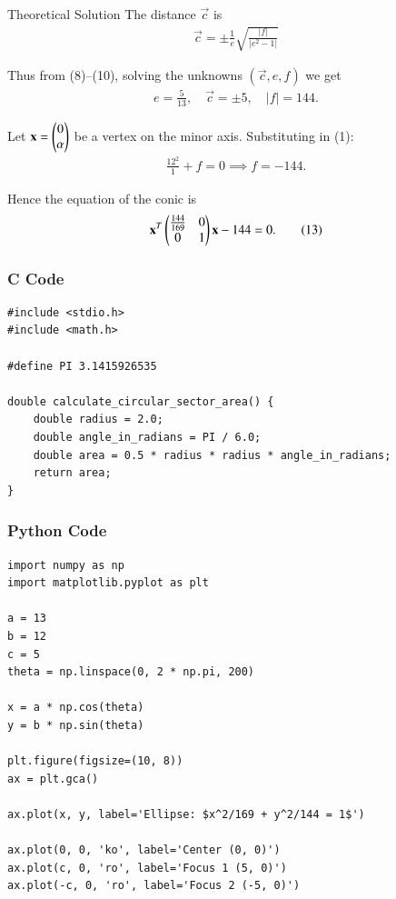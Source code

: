 \documentclass{beamer}
\begin{document}
\begin{frame}{Theoretical Solution}
The distance $\vec{c}$ is
\begin{align}
\vec{c} = \pm \frac{1}{e}\sqrt{\frac{|f|}{|e^2-1|}} \tag{10}
\end{align}

Thus from (8)--(10), solving the unknowns $(\vec{c},e,f)$ we get
\begin{align}
e = \tfrac{5}{13},\quad \vec{c} = \pm 5, \quad |f| = 144. \tag{11}
\end{align}

Let $\mathbf{x}=\begin{pmatrix}0\\\alpha\end{pmatrix}$ be a vertex on the minor axis. Substituting in (1):
\begin{align}
\frac{12^2}{1} + f = 0 \implies f=-144. \tag{12}
\end{align}

Hence the equation of the conic is
\begin{align*}
\mathbf{x}^T \begin{pmatrix}\tfrac{144}{169} & 0 \\ 0 & 1\end{pmatrix} \mathbf{x} - 144 = 0. \tag{13}
\end{align*}
\end{frame}

\begin{frame}[fragile]
    \frametitle{C Code}
    \begin{lstlisting}
#include <stdio.h>
#include <math.h>

#define PI 3.1415926535

double calculate_circular_sector_area() {
    double radius = 2.0;
    double angle_in_radians = PI / 6.0;
    double area = 0.5 * radius * radius * angle_in_radians;
    return area;
}
    \end{lstlisting}
\end{frame}

\begin{frame}[fragile]
    \frametitle{Python Code}
    \begin{lstlisting}
import numpy as np
import matplotlib.pyplot as plt

a = 13
b = 12
c = 5
theta = np.linspace(0, 2 * np.pi, 200)

x = a * np.cos(theta)
y = b * np.sin(theta)

plt.figure(figsize=(10, 8))
ax = plt.gca()

ax.plot(x, y, label='Ellipse: $x^2/169 + y^2/144 = 1$')

ax.plot(0, 0, 'ko', label='Center (0, 0)')
ax.plot(c, 0, 'ro', label='Focus 1 (5, 0)')
ax.plot(-c, 0, 'ro', label='Focus 2 (-5, 0)')
    \end{lstlisting}
\end{frame}
\end{document}
